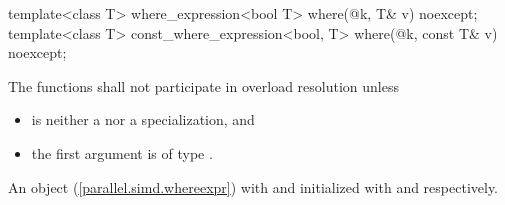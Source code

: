 \begin{itemdecl}
template<class T> where_expression<bool T> where(@\seebelow@ k, T& v) noexcept;
template<class T>
  const_where_expression<bool, T> where(@\seebelow@ k, const T& v) noexcept;
\end{itemdecl}

\begin{itemdescr}
  \pnum\remarks
  The functions shall not participate in overload resolution unless

  \begin{itemize}
    \item {} is neither a  nor a  specialization, and
    \item the first argument is of type .
  \end{itemize}

  \pnum\returns
  An object (\ref{parallel.simd.whereexpr}) with  and  initialized with  and  respectively.
\end{itemdescr}
